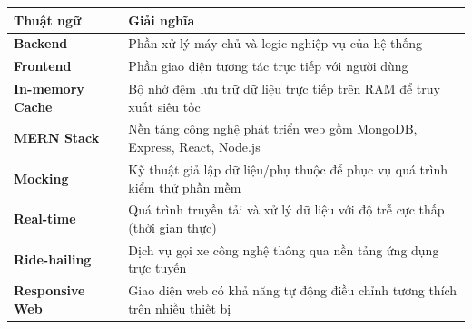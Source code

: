 \documentclass[../DoAn.tex]{subfiles}
\begin{document}
\begin{longtable}{l p{12cm}}
	\hline
	\textbf{Thuật ngữ}       & \textbf{Giải nghĩa}                                                          \\ \hline
	\textbf{Backend}         & Phần xử lý máy chủ và logic nghiệp vụ của hệ thống                           \\
	\textbf{Frontend}        & Phần giao diện tương tác trực tiếp với người dùng                            \\
	\textbf{In-memory Cache} & Bộ nhớ đệm lưu trữ dữ liệu trực tiếp trên RAM để truy xuất siêu tốc          \\
	\textbf{MERN Stack}      & Nền tảng công nghệ phát triển web gồm MongoDB, Express, React, Node.js       \\
	\textbf{Mocking}         & Kỹ thuật giả lập dữ liệu/phụ thuộc để phục vụ quá trình kiểm thử phần mềm    \\
	\textbf{Real-time}       & Quá trình truyền tải và xử lý dữ liệu với độ trễ cực thấp (thời gian thực)   \\
	\textbf{Ride-hailing}    & Dịch vụ gọi xe công nghệ thông qua nền tảng ứng dụng trực tuyến              \\
	\textbf{Responsive Web}  & Giao diện web có khả năng tự động điều chỉnh tương thích trên nhiều thiết bị \\
	\hline
\end{longtable}
\end{document}
